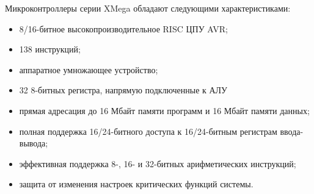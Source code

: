 Микроконтроллеры серии XMega обладают следующими характеристиками:
\begin{itemize}
	\item{} 8/16-битное высокопроизводительное RISC ЦПУ AVR;
	\item{} 138 инструкций;
	\item{} аппаратное умножающее устройство;
	\item{} 32 8-битных регистра, напрямую подключенные к АЛУ
	\item{} прямая адресация до 16 Мбайт памяти программ и 16 Мбайт памяти данных;
	\item{} полная поддержка 16/24-битного доступа к 16/24-битным регистрам ввода-вывода;
	\item{} эффективная поддержка 8-, 16- и 32-битных арифметических инструкций;
	\item{} защита от изменения настроек критических функций системы.
\end{itemize}


